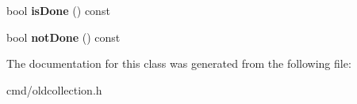 \begin{DoxyCompactItemize}
\item 
bool {\bfseries is\+Done} () const \hypertarget{classUnitCollection_1_1ConstFastIterator_a3ec15abed99321952ea21b3aa2b93348}{}\label{classUnitCollection_1_1ConstFastIterator_a3ec15abed99321952ea21b3aa2b93348}

\item 
bool {\bfseries not\+Done} () const \hypertarget{classUnitCollection_1_1ConstFastIterator_a9a2e332cd4fc852bd45c336a3c90d83a}{}\label{classUnitCollection_1_1ConstFastIterator_a9a2e332cd4fc852bd45c336a3c90d83a}

\end{DoxyCompactItemize}


The documentation for this class was generated from the following file\+:\begin{DoxyCompactItemize}
\item 
cmd/oldcollection.\+h\end{DoxyCompactItemize}
